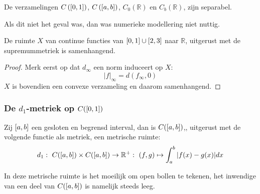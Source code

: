 \documentclass[main.tex]{subfiles}
\begin{document}
\begin{vb}
  De verzamelingen $C\left(\interval{0}{1}\right)$, $C\left(\interval{a}{b}\right)$, $C_{0}\left(\mathbb{R}\right)$ en $C_{b}\left(\mathbb{R}\right)$, zijn separabel.
\end{vb}

\begin{opm}
  Als dit niet het geval was, dan was numerieke modellering niet nuttig.
\end{opm}

\begin{vb}
  De ruimte $X$ van continue functies van $\interval{0}{1} \cup \interval{2}{3}$ naar $\mathbb{R}$, uitgerust met de supremummetriek is samenhangend.

  \begin{proof}
    Merk eerst op dat $d_{\infty}$ een norm induceert op $X$:
    \[ |f|_{\infty} = d(f_{\infty},0) \]
    $X$ is bovendien een convexe verzameling en daarom samenhangend.
  \end{proof}
\end{vb}

\subsubsection{De $d_1$-metriek op $C(\interval{0}{1})$}
\label{sec:de-d_1-metriek}

\begin{vb}
  Zij $\interval{a}{b}$ een gesloten en begrensd interval, dan is $C(\interval{a}{b})$,, uitgerust met de volgende functie als metriek, een metrische ruimte:
  \[ d_{1}:\ C(\interval{a}{b})\times C(\interval{a}{b}) \rightarrow \mathbb{R}^{+}:\ (f,g) \mapsto \int_{a}^{b}|f(x)-g(x)|dx \]
\end{vb}

\begin{opm}
  In deze metrische ruimte is het moeilijk om open bollen te tekenen, het inwendige van een deel van $C(\interval{a}{b})$ is namelijk steeds leeg.
\end{opm}
\end{document}
